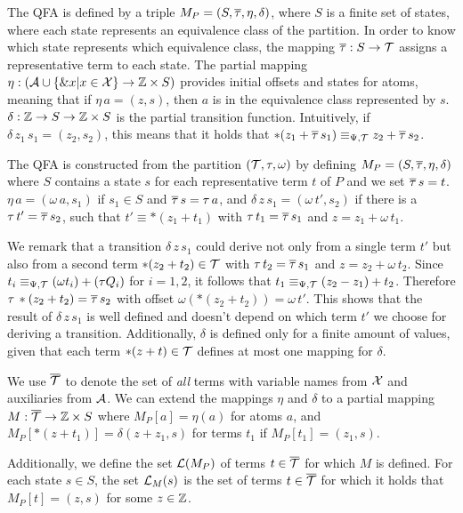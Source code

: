 The QFA is defined by a triple $M_P = (S, \overline{\tau}, \eta, \delta)$, where $S$ is a finite set of states, where each state represents an equivalence class of the partition.
In order to know which state represents which equivalence class, the mapping $\overline{\tau} : S \rightarrow \mathcal{T}$
assigns a representative term to each state.
The partial mapping $\eta : (\mathcal{A} \cup \{\&x | x \in \mathcal{X}\} \rightarrow \mathbb{Z} \times S)$ provides initial offsets and states for atoms, meaning that if $\eta\,a = (z,s)$, then $a$ is in the equivalence class represented by $s$.
$\delta : \mathbb{Z} \rightarrow S \rightarrow \mathbb{Z} \times S$ is the partial transition function.
Intuitively, if $\delta\,z_1\,s_1 = (z_2, s_2)$, this means that it holds that $*(z_1 + \overline{\tau}\,s_1) \equiv_{\Psi,\mathcal{T}} z_2 + \overline{\tau}\,s_2$.

The QFA is constructed from the partition  $(\mathcal{T}, \tau, \omega)$ by defining $M_P = (S, \overline{\tau}, \eta, \delta)$ where $S$ contains a state $s$ for each representative term $t$ of $P$ and we set $\overline{\tau}\,s = t$.
$\eta\,a = (\omega\,a, s_1)$ if $s_1 \in S$ and $\overline{\tau}\,s = \tau\,a$,
and $\delta\,z\,s_1 = (\omega\,t', s_2)$ if there is a $\tau\,t'=\overline{\tau}\,s_2$, such that $t' \equiv *(z_1 + t_1)$ with $\tau \,t_1= \overline{\tau}\,s_1$ and $z = z_1 + \omega\,t_1$.

We remark that a transition $\delta\,z\,s_1$ could derive not only from a single term $t'$ but also from a second term $*(z_2 + t_2) \in \mathcal{T}$ with $\tau\,t_2=\overline{\tau}\,s_1$ and $z = z_2 + \omega\,t_2$.
Since $t_i \equiv_{\Psi,\mathcal{T}} (\omega t_i) + (\tau Q_i)$ for $i = 1,2$, it follows that $t_1 \equiv_{\Psi,\mathcal{T}} (z_2 - z_1)+ t_2$.
Therefore $\tau\,*(z_2+t_2)=\overline{\tau}\,s_2$ with offset $\omega(*(z_2+t_2)) = \omega\,t'$.
This shows that the result of $\delta\,z\,s_1$ is well defined and doesn't depend on which term $t'$ we choose for deriving a transition.
Additionally, $\delta$ is defined only for a finite amount of values, given that each term $*(z + t) \in \mathcal{T}$ defines at most one mapping for $\delta$.

We use ${\overline{\mathcal{T}}}$ to denote the set of \emph{all} terms with variable names from $\mathcal{X}$ and auxiliaries from $\mathcal{A}$.
We can extend the mappings $\eta$ and $\delta$ to a partial mapping $M : {\overline{\mathcal{T}}} \rightarrow \mathbb{Z} \times S$ where $M_P[a] = \eta(a)$ for atoms $a$, and $M_P[*(z+t_1)] = \delta(z+z_1, s)$ for terms $t_1$ if $M_P[t_1] = (z_1,s)$.

Additionally, we define the set $\mathcal{L}(M_P)$ of terms $t \in {\overline{\mathcal{T}}}$ for which $M$ is defined.
For each state $s \in S$, the set $\mathcal{L}_M(s)$ is the set of terms $t \in {\overline{\mathcal{T}}}$ for which it holds that $M_P[t] = (z, s)$ for some $z \in \mathbb{Z}$.

